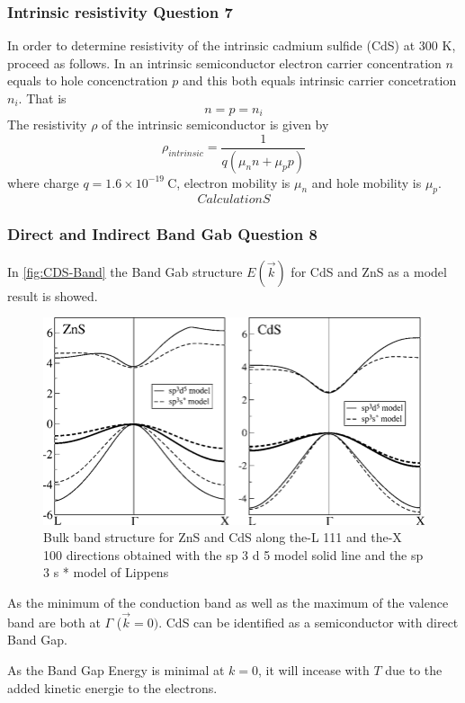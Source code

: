 \subsubsection*{Intrinsic resistivity Question 7}
In order to determine resistivity of the intrinsic cadmium sulfide (CdS) at 300 K, proceed as follows. In an intrinsic semiconductor electron carrier concentration $n$ equals to hole concenctration $p$ and this both equals intrinsic carrier concetration $n_i$. That is
$$
n = p = n_i 
$$
The resistivity $\rho$ of the intrinsic semiconductor is given by
$$
\rho_{intrinsic} = \frac{1}{q(\mu_nn + \mu_pp)}
$$
where charge $q = 1.6 \times 10^{-19}\ \mathrm{C}$, electron mobility is $\mu_n$ and hole mobility is $\mu_p$.
\begin{equation}
CalculationS
\end{equation}

\subsubsection*{Direct and Indirect Band Gab Question 8}

In \autoref{fig:CDS-Band} the Band Gab structure $E(\vec{k})$ for CdS and ZnS as 
a model result is showed.

\begin{figure}[H]
  \centering
  \includegraphics[width=0.7\linewidth]{Graphics/Chapter3/Bulk-band-structure-for-ZnS-and-CdS-along-the-L-111-and-the-X-100-directions-obtained.png}
  \caption{Bulk band structure for ZnS and CdS along the-L 111 and the-X 100 directions obtained with the sp 3 d 5 
  model solid line and the sp 3 s * model of Lippens \cite{band_gap_CdS}}
  \label{fig:CDS-Band}
\end{figure}

As the minimum of the conduction band as well as the maximum of the valence band are both 
at $\Gamma$ ($\vec{k}= 0)$. CdS can be identified as a semiconductor with
direct Band Gap.

As the Band Gap Energy is minimal at $k=0$, it will incease 
with $T$ due to the added kinetic energie to the electrons.

